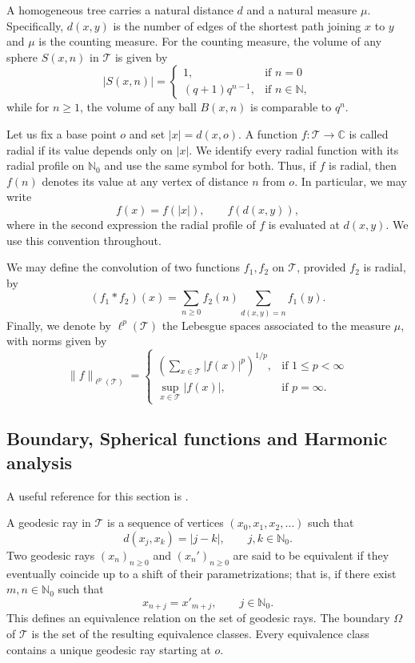 \documentclass[10pt,a4paper]{amsart}
\renewcommand\mathcal{\mathscr}
\theoremstyle{plain}
\theoremstyle{remark}
\theoremstyle{definition}
\begin{document}
	A homogeneous tree carries a natural distance $d$ and a natural measure $\mu$. Specifically, $d(x,y)$ is the number of edges of the shortest path joining $x$ to $y$ and $\mu$ is the counting measure. For the counting measure, the volume of any sphere $S(x,n)$ in $\mathcal{T}$ is given by
	\[
	|S(x,n)|=\begin{cases}
		1, & \text{if } n=0\\
		(q+1)q^{n-1}, & \text{if } n\in \mathbb{N},
	\end{cases}
	\]
	while for $n \geq 1$, the volume of any ball $B(x,n)$ is comparable to $q^{n}$.
	
	Let us fix a base point $o$ and set $|x|=d(x,o)$. A function
$f:\mathcal T\to\mathbb C$ is called radial if its value depends only
on $|x|$. We identify every radial function with its radial profile on
$\mathbb{N}_0$ and use the same symbol for both. Thus, if $f$ is radial,
then $f(n)$ denotes its value at any vertex of distance $n$ from $o$.
In particular, we may write
\[
f(x)=f(|x|),\qquad
f(d(x,y)),
\]
where in the second expression the radial profile of $f$ is evaluated
at $d(x,y)$. We use this convention throughout.

    
	We may define the convolution of two functions $f_1, f_2$ on $\mathcal{T}$,  provided $f_2$ is radial, by
	\begin{equation}\label{convradial}
		(f_1\ast f_2)(x)=\sum\limits_{n\geq 0}f_2(n)\sum\limits_{d(x,y)=n}f_1(y).
	\end{equation}
	Finally, we denote by  $\ell^p(\mathcal{T})$ the Lebesgue spaces  associated to the measure $\mu$, with norms given by
	\[
	\|f\|_{\ell^p(\mathcal{T})}=
	\begin{cases}
		\left(\sum\limits_{x\in\mathcal{T}}|f(x)|^p \right)^{1/p}, & \text{if } 1\leq p<\infty\\
		\sup\limits_{x\in\mathcal{T}}|f(x)|, & \text{if } p=\infty.
	\end{cases}
	\]
	
	\subsection{Boundary, Spherical functions and Harmonic analysis} \label{sec:HA}

	A useful reference for this section is \cite{CMS0}. 
	
	A geodesic ray in $\mathcal T$ is a sequence of vertices
$(x_0,x_1,x_2,\ldots)$ such that
\[
d(x_j,x_k)=|j-k|,
\qquad j,k\in\mathbb N_0.
\]
Two geodesic rays $(x_n)_{n\geq0}$ and $(x_n')_{n\geq0}$ are said to
be equivalent if they eventually coincide up to a shift of their
parametrizations; that is, if there exist $m,n\in\mathbb N_0$ such
that
\[
x_{n+j}=x'_{m+j},
\qquad j\in\mathbb N_0.
\]
This defines an equivalence relation on the set of geodesic rays.
The boundary $\Omega$ of $\mathcal T$ is the set of the resulting
equivalence classes. Every equivalence class contains a unique
geodesic ray starting at $o$.
\end{document}
